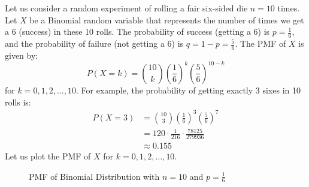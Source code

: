 \documentclass[openany]{book}
\begin{document}
\begin{example}
    Let us consider a random experiment of rolling a fair six-sided die $n = 10$ times. Let $X$ be a Binomial random variable that represents the number of times we get a 6 (success) in these 10 rolls. The probability of success (getting a 6) is $p = \frac{1}{6}$, and the probability of failure (not getting a 6) is $q = 1 - p = \frac{5}{6}$. The PMF of $X$ is given by:
    $$P(X = k) = \binom{10}{k} \left(\frac{1}{6}\right)^k \left(\frac{5}{6}\right)^{10 - k}$$
    for $k = 0, 1, 2, \ldots, 10$. For example, the probability of getting exactly 3 sixes in 10 rolls is:
    \begin{align*}
        P(X = 3) &= \binom{10}{3} \left(\frac{1}{6}\right)^3 \left(\frac{5}{6}\right)^{7} \\
        &= 120 \cdot \frac{1}{216} \cdot \frac{78125}{279936} \\
        &\approx 0.155
    \end{align*}
    Let us plot the PMF of $X$ for $k = 0, 1, 2, \ldots, 10$.
    \begin{figure}[H]
    \centering
    \caption{PMF of Binomial Distribution with $n=10$ and $p=\frac{1}{6}$}
    \end{figure}
\end{example}
\end{document}
